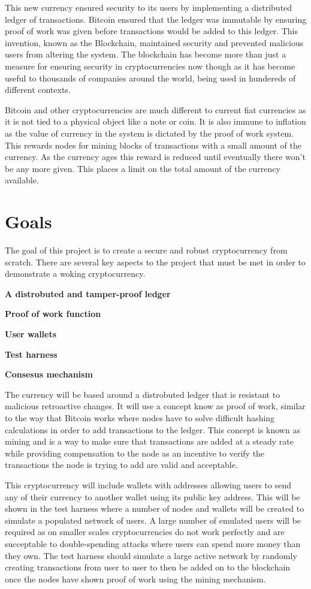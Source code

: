 \documentclass{l4proj}
\begin{document}
This new currency ensured security to its users by implementing a distributed ledger of transactions. Bitcoin
ensured that the ledger was immutable by ensuring proof of work was given before transactions would be
added to this ledger. This invention, known as the Blockchain, maintained security and prevented malicious
users from altering the system. The blockchain has become more than just a measure for ensuring security
in cryptocurrencies now though as it has become useful to thousands of companies around the world, being used
in hundereds of different contexts.

Bitcoin and other cryptocurrencies are much different to current fiat currencies as it is not tied to a physical
object like a note or coin. It is also immune to inflation as the value of currency in the system is dictated
by the proof of work system. This rewards nodes for mining blocks of transactions with a small amount of the 
currency. As the currency ages this reward is reduced until eventually there won't be any more given. This places
a limit on the total amount of the currency available.

\section{Goals}
The goal of this project is to create a secure and robust cryptocurrency from scratch. There are several key aspects
to the project that must be met in order to demonstrate a woking cryptocurrency.

\textbf{A distrobuted and tamper-proof ledger}

\textbf{Proof of work function}

\textbf{User wallets}

\textbf{Test harness}

\textbf{Consesus mechanism}

The currency will be based around
a distrobuted ledger that is resistant to malicious retroactive changes. It will use a concept know as proof of work,
similar to the way that Bitcoin works where nodes have to solve difficult hashing calculations in order
to add transactions to the ledger. This concept is known as mining and is a way to make sure that transactions
are added at a steady rate while providing compensation to the node as an incentive to verify the transactions the node
is trying to add are valid and acceptable.

This cryptocurrency will include wallets with addresses allowing users to send any of their currency to another
wallet using its public key address. This will be shown in the test harness where a number of nodes and wallets 
will be created to simulate a populated network of users. A large number of emulated users will be required as on
smaller scales cryptocurrencies do not work perfectly and are succeptable to double-spending attacks where users
can spend more money than they own. The test harness should simulate a large active network by randomly creating
transactions from user to user to then be added on to the blockchain once the nodes have shown proof of work using 
the mining mechanism.
\end{document}
